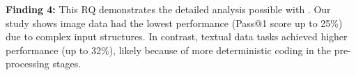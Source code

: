 \begin{tcolorbox}[boxrule=0.5pt, colback=gray!10,  arc=4pt,left=3pt,right=3pt,top=3pt,bottom=3pt,boxsep=0pt
]
\textbf{Finding 4:} This RQ demonstrates the detailed analysis possible with \tool. Our study shows image data had the lowest performance (Pass@1 score up to 25\%) due to complex input structures. In contrast, textual data tasks achieved higher performance (up to 32\%), likely because of more deterministic coding in the pre-processing stages.
\end{tcolorbox}
